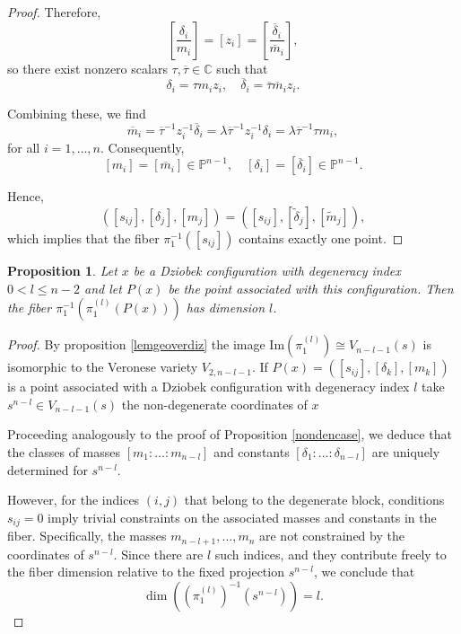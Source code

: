 \documentclass{amsart}
\newtheorem{proposition}[theorem]{Proposition}
\theoremstyle{definition}
\theoremstyle{remark}
\numberwithin{equation}{section}
\begin{document}
\begin{proof}
Therefore,
\[
\left[ \frac{\delta_i}{m_i} \right] = [z_i] = \left[ \frac{\overline{\delta}_i}{\overline{m}_i} \right],
\]
so there exist nonzero scalars $\tau, \overline{\tau} \in \mathbb{C}$ such that
\[
\delta_i = \tau m_i z_i, \quad \overline{\delta}_i = \overline{\tau} \overline{m}_i z_i.
\]

Combining these, we find
\[
\overline{m}_i = \overline{\tau}^{-1} z_i^{-1} \overline{\delta}_i = \lambda \overline{\tau}^{-1} z_i^{-1} \delta_i = \lambda \overline{\tau}^{-1} \tau m_i,
\]
for all $i = 1, \dots, n$. Consequently,
\[
[m_i] = [\overline{m}_i] \in \mathbb{P}^{n-1}, \quad [\delta_i] = [\overline{\delta}_i] \in \mathbb{P}^{n-1}.
\]

Hence,
\[
([s_{ij}], [\delta_j], [m_j]) = ([s_{ij}], [\tilde{\delta}_j], [\tilde{m}_j]),
\]
which implies that the fiber $\pi_1^{-1}([s_{ij}])$ contains exactly one point.
\end{proof}





\begin{proposition}\label{dencase}
Let $x$ be a Dziobek configuration with degeneracy index $0< l \leq n-2$ and let $P(x)$ be the point associated with this configuration. Then the fiber $\pi_1^{-1}(\pi_{1}^{(l)}(P(x)))$ has dimension $l$.
\end{proposition}

\begin{proof}

By proposition \ref{lemgeoverdiz} the image $\text{Im}(\pi_{1}^{(l)}) \cong V_{n-l-1}(s)$ is isomorphic to the Veronese variety $V_{2,n-l-1}$. If  $P(x)= ([s_{ij}], [\delta_k], [m_k])$ is a point associated with a Dziobek configuration with degeneracy index $l$ take $s^{n-l}\in V_{n-l-1}(s)$ the non-degenerate coordinates of $x$  



Proceeding analogously to the proof of Proposition \ref{nondencase}, we deduce that the classes of masses $[m_1: \dots : m_{n-l}]$ and constants $[\delta_1 : \dots : \delta_{n-l}]$ are uniquely determined for $s^{n-l}$.

However, for the indices $(i,j)$ that belong to the degenerate block, conditions $s_{ij}=0$ imply trivial constraints on the associated masses and constants in the fiber. Specifically, the masses $m_{n-l+1}, \dots, m_n$ are not constrained by the coordinates of $s^{n-l}$. Since there are $l$ such indices, and they contribute freely to the fiber dimension relative to the fixed projection $s^{n-l}$, we conclude that
\[
\dim \left( (\pi_1^{(l)})^{-1}(s^{n-l}) \right) = l.
\]
\end{proof}
\end{document}
